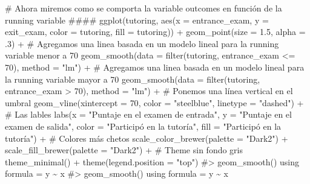 \documentclass[
  letterpaper,
  DIV=11,
  numbers=noendperiod,
  oneside]{scrreprt}
\newenvironment{Shaded}{\begin{snugshade}}{\end{snugshade}}
\newcommand{\AttributeTok}[1]{\textcolor[rgb]{0.40,0.45,0.13}{#1}}
\newcommand{\CommentTok}[1]{\textcolor[rgb]{0.37,0.37,0.37}{#1}}
\newcommand{\DecValTok}[1]{\textcolor[rgb]{0.68,0.00,0.00}{#1}}
\newcommand{\FloatTok}[1]{\textcolor[rgb]{0.68,0.00,0.00}{#1}}
\newcommand{\FunctionTok}[1]{\textcolor[rgb]{0.28,0.35,0.67}{#1}}
\newcommand{\NormalTok}[1]{\textcolor[rgb]{0.00,0.23,0.31}{#1}}
\newcommand{\SpecialCharTok}[1]{\textcolor[rgb]{0.37,0.37,0.37}{#1}}
\newcommand{\StringTok}[1]{\textcolor[rgb]{0.13,0.47,0.30}{#1}}
\begin{document}
\begin{Shaded}
\begin{Highlighting}[]
\CommentTok{\# Ahora miremos como se comporta la variable outcomes en función de la running variable \#\#\#\#}
\FunctionTok{ggplot}\NormalTok{(tutoring, }\FunctionTok{aes}\NormalTok{(}\AttributeTok{x =}\NormalTok{ entrance\_exam, }
                     \AttributeTok{y =}\NormalTok{ exit\_exam, }
                     \AttributeTok{color =}\NormalTok{ tutoring,}
                     \AttributeTok{fill =}\NormalTok{ tutoring)) }\SpecialCharTok{+}
  \FunctionTok{geom\_point}\NormalTok{(}\AttributeTok{size =} \FloatTok{1.5}\NormalTok{, }\AttributeTok{alpha =}\NormalTok{ .}\DecValTok{3}\NormalTok{) }\SpecialCharTok{+} 
  \CommentTok{\# Agregamos una linea basada en un modelo lineal para la running variable menor a 70}
  \FunctionTok{geom\_smooth}\NormalTok{(}\AttributeTok{data =} \FunctionTok{filter}\NormalTok{(tutoring, entrance\_exam }\SpecialCharTok{\textless{}=} \DecValTok{70}\NormalTok{), }\AttributeTok{method =} \StringTok{"lm"}\NormalTok{) }\SpecialCharTok{+}
  \CommentTok{\# Agregamos una linea basada en un modelo lineal para la running variable mayor a 70}
  \FunctionTok{geom\_smooth}\NormalTok{(}\AttributeTok{data =} \FunctionTok{filter}\NormalTok{(tutoring, entrance\_exam }\SpecialCharTok{\textgreater{}} \DecValTok{70}\NormalTok{), }\AttributeTok{method =} \StringTok{"lm"}\NormalTok{) }\SpecialCharTok{+}
  \CommentTok{\# Ponemos una línea vertical en el umbral}
  \FunctionTok{geom\_vline}\NormalTok{(}\AttributeTok{xintercept =} \DecValTok{70}\NormalTok{, }\AttributeTok{color =} \StringTok{"steelblue"}\NormalTok{, }\AttributeTok{linetype =} \StringTok{"dashed"}\NormalTok{) }\SpecialCharTok{+} 
  \CommentTok{\# Las lables}
  \FunctionTok{labs}\NormalTok{(}\AttributeTok{x =} \StringTok{"Puntaje en el examen de entrada"}\NormalTok{, }
       \AttributeTok{y =} \StringTok{"Puntaje en el examen de salida"}\NormalTok{,}
       \AttributeTok{color =} \StringTok{"Participó en la tutoría"}\NormalTok{,}
       \AttributeTok{fill =} \StringTok{"Participó en la tutoría"}\NormalTok{) }\SpecialCharTok{+} 
  \CommentTok{\# Colores más chetos}
  \FunctionTok{scale\_color\_brewer}\NormalTok{(}\AttributeTok{palette =} \StringTok{"Dark2"}\NormalTok{) }\SpecialCharTok{+}
  \FunctionTok{scale\_fill\_brewer}\NormalTok{(}\AttributeTok{palette =} \StringTok{"Dark2"}\NormalTok{) }\SpecialCharTok{+}
  \CommentTok{\# Theme sin fondo gris}
  \FunctionTok{theme\_minimal}\NormalTok{() }\SpecialCharTok{+}
  \FunctionTok{theme}\NormalTok{(}\AttributeTok{legend.position =} \StringTok{"top"}\NormalTok{)}
\CommentTok{\#\textgreater{} \textasciigrave{}geom\_smooth()\textasciigrave{} using formula = \textquotesingle{}y \textasciitilde{} x\textquotesingle{}}
\CommentTok{\#\textgreater{} \textasciigrave{}geom\_smooth()\textasciigrave{} using formula = \textquotesingle{}y \textasciitilde{} x\textquotesingle{}}
\end{Highlighting}
\end{Shaded}
\end{document}
